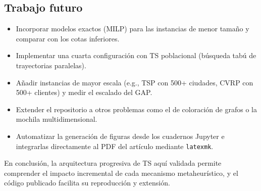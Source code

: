 \subsection*{Trabajo futuro}

\begin{itemize}
  \item Incorporar modelos exactos (MILP) para las instancias de menor
    tamaño y comparar con los cotas inferiores.
  \item Implementar una cuarta configuración con TS poblacional
    (búsqueda tabú de trayectorias paralelas).
  \item Añadir instancias de mayor escala (e.g., TSP con 500+ ciudades,
    CVRP con 500+ clientes) y medir el escalado del GAP.
  \item Extender el repositorio a otros problemas como el de coloración
    de grafos o la mochila multidimensional.
  \item Automatizar la generación de figuras desde los cuadernos Jupyter
    e integrarlas directamente al PDF del artículo mediante \texttt{latexmk}.
\end{itemize}

En conclusión, la arquitectura progresiva de TS aquí validada permite
comprender el impacto incremental de cada mecanismo metaheurístico, y el
código publicado facilita su reproducción y extensión.
